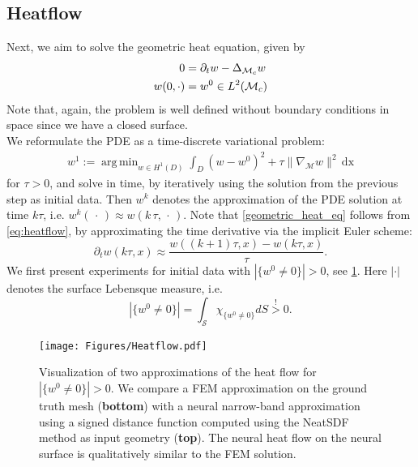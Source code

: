 \documentclass[12pt,openany]{book}
\theoremstyle{plainnormal}
\theoremstyle{remark}
\DeclareMathOperator*{\argmin}{arg\,min}
\begin{document}
\subsection{Heatflow}\label{section_heatflow}
Next, we aim to solve the geometric heat equation, given by
\begin{align}\label{eq:heatflow}
    0 &= \partial_t w - \Delta_{\mathcal{M}_c} w \\
    w(0,\cdot) &= w^0 \in L^2(\mathcal{M}_c)  \notag
\end{align}
Note that, again, the problem is well defined without boundary conditions in space since we have a closed surface.\\
We reformulate the PDE as a time-discrete variational problem:
\begin{align}\label{geometric_heat_eq}
    w^{1} := \argmin_{w\in H^1(D)}\int_D (w - w^0)^2 + \tau \|\nabla_{\mathcal{M}}w\|^2 \,\mathrm{dx}
\end{align} for $\tau > 0 $, and solve in time, by iteratively using the solution from the previous step as initial data. Then $w^k$ denotes the approximation of the PDE solution at time $k\tau$, i.e. $w^k(\,\cdot\,) \approx w(k\,\tau, \,\cdot\,)$. Note that \cref{geometric_heat_eq} follows from \cref{eq:heatflow}, by approximating the time derivative via the implicit Euler scheme:  $$\partial_t w(k\tau, x) \approx \frac{w((k+1)\tau, x) - w(k\tau, x)}{\tau}. $$
We first present experiments for initial data with $|\{w^0 \neq0\}| >0$, see \cref{comp_beethoven}. Here $|\cdot|$ denotes the surface Lebensque measure, i.e. $$|\{w^0 \neq0\}| = \int_\mathcal{S} \chi_{\{w^0 \neq 0\}} dS \overset{!}{>} 0.$$
\begin{figure}[]
    \centering    
    \texttt{[image: Figures/Heatflow.pdf]}
\caption{Visualization of two approximations of the heat flow for $|\{w^0 \neq0\}| >0$. We compare a FEM approximation on the ground truth mesh (\textbf{bottom}) with a neural narrow-band approximation using a signed distance function computed using the NeatSDF method as input geometry (\textbf{top}). The neural heat flow on the neural surface is qualitatively similar to the FEM solution.}\label{comp_beethoven}
\end{figure}
        
        
\end{document}
